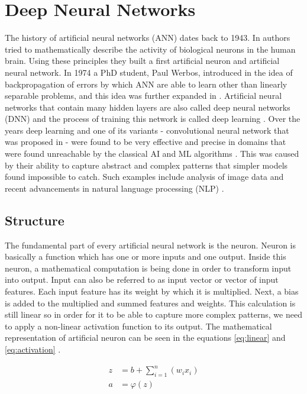 \chapter{Deep Neural Networks}

The history of artificial neural networks (ANN) dates back to 1943. In \cite{McCulloch1943} authors tried to mathematically describe the activity of biological neurons in the human brain. Using these principles they built a first artificial neuron and artificial neural network. In 1974 a PhD student, Paul Werbos, introduced in \cite{Werbos1974} the idea of backpropagation of errors by which ANN are able to learn other than linearly separable problems, and this idea was further expanded in \cite{Rumelhart1986}. Artificial neural networks that contain many hidden layers are also called deep neural networks (DNN) and the process of training this network is called deep learning \cite{LeCun2015}. Over the years deep learning and one of its variants - convolutional neural network that was proposed in \cite{LeCun2015-2} - were found to be very effective and precise in domains that were found unreachable by the classical AI and ML algorithms \cite{LeCun2015}. This was caused by their ability to capture abstract and complex patterns that simpler models found impossible to catch. Such examples include analysis of image data \cite{Farabet2013, Alzubaidi2021} and recent advancements in natural language processing (NLP) \cite{Deng2018}.

\section{Structure}
The fundamental part of every artificial neural network is the neuron. Neuron is basically a function which has one or more inputs and one output. Inside this neuron, a mathematical computation is being done in order to transform input into output. Input can also be referred to as input vector or vector of input features. Each input feature has its weight by which it is multiplied. Next, a bias is added to the multiplied and summed features and weights. This calculation is still linear so in order for it to be able to capture more complex patterns, we need to apply a non-linear activation function to its output. The mathematical representation of artificial neuron can be seen in the equations \ref{eq:linear} and \ref{eq:activation} \cite{Goodfellow2016}.

\begin{align}
\label{eq:linear}
    z &= b + \sum_{i=1}^n (w_i x_i) \\
\label{eq:activation}
    a &= \varphi(z)
\end{align}

